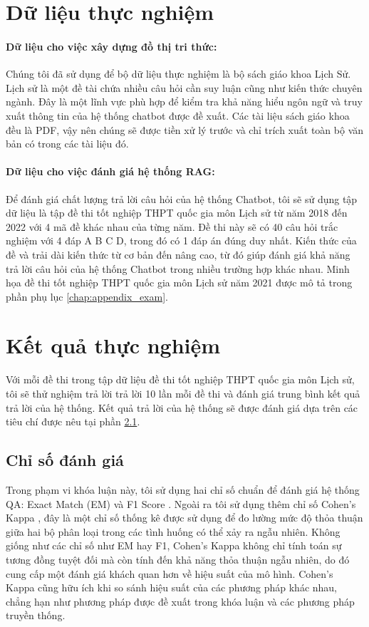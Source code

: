 \section{Dữ liệu thực nghiệm}
\label{sec:experiment_data}
\paragraph{Dữ liệu cho việc xây dựng đồ thị tri thức:}
Chúng tôi đã sử dụng để bộ dữ liệu thực nghiệm là bộ sách giáo khoa Lịch Sử. Lịch sử là một đề tài chứa nhiều câu hỏi cần suy luận cũng như kiến thức chuyên ngành. Đây là một lĩnh vực phù hợp để kiểm tra khả năng hiểu ngôn ngữ và truy xuất thông tin của hệ thống chatbot được đề xuất. Các tài liệu sách giáo khoa đều là PDF, vậy nên chúng sẽ được tiền xử lý trước và chỉ trích xuất toàn bộ văn bản có trong các tài liệu đó.
\paragraph{Dữ liệu cho việc đánh giá hệ thống RAG:}
Để đánh giá chất lượng trả lời câu hỏi của hệ thống Chatbot, tôi sẽ sử dụng tập dữ liệu là tập đề thi tốt nghiệp THPT quốc gia môn Lịch sử từ năm 2018 đến 2022 với 4 mã đề khác nhau của từng năm. Đề thi này sẽ có 40 câu hỏi trắc nghiệm với 4 đáp A B C D, trong đó có 1 đáp án đúng duy nhất. Kiến thức của đề và trải dài kiến thức từ cơ bản đến nâng cao, từ đó giúp đánh giá khả năng trả lời câu hỏi của hệ thống Chatbot trong nhiều trường hợp khác nhau. Minh họa đề thi tốt nghiệp THPT quốc gia môn Lịch sử năm 2021 được mô tả trong phần phụ lục \ref{chap:appendix_exam}.


\section{Kết quả thực nghiệm}
\label{section:experiment_results}
Với mỗi đề thi trong tập dữ liệu đề thi tốt nghiệp THPT quốc gia môn Lịch sử, tôi sẽ thử nghiệm trả lời trả lời 10 lần mỗi đề thi và đánh giá trung bình kết quả trả lời của hệ thống. Kết quả trả lời của hệ thống sẽ được đánh giá dựa trên các tiêu chí được nêu tại phần \ref{section:evaluation_metrics}.
\subsection{Chỉ số đánh giá}
\label{section:evaluation_metrics}
Trong phạm vi khóa luận này, tôi sử dụng hai chỉ số chuẩn để đánh giá hệ thống QA: Exact Match (EM) và F1 Score \cite{rajpurkar-etal-2016-squad}. Ngoài ra tôi sử dụng thêm chỉ số Cohen’s Kappa \cite{article_cohens_kappa}, đây là một chỉ số thống kê được sử dụng để đo lường mức độ
thỏa thuận giữa hai bộ phân loại trong các tình huống có thể xảy ra ngẫu nhiên. Không giống như các chỉ số như EM hay F1, Cohen’s Kappa không chỉ tính toán sự tương đồng tuyệt đối mà còn tính đến khả năng thỏa thuận ngẫu nhiên, do đó cung cấp một đánh giá khách quan hơn về hiệu suất của mô hình. Cohen's Kappa cũng hữu ích khi so sánh hiệu suất của các phương pháp khác nhau, chẳng hạn như phương pháp được đề xuất trong khóa luận và các phương pháp truyền thống.


